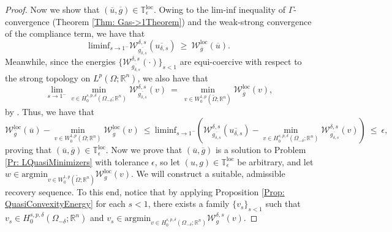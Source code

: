 \documentclass[11pt, reqno]{amsart}   	%
\theoremstyle{plain}
\numberwithin{equation}{section}
\def\de{\delta}
\def\ep{\epsilon}
\def\Ga{\Gamma}
\def\Om{\Omega}
\def\R{\mathbb{R}}
\def\argmin{\text{argmin}}
\def\liminf{\text{liminf}}
\def\loc{\text{loc}}
\newcommand{\JMS}[1]{{\color{orange} {\bf J. Siktar:} [#1] }}
\begin{document}
\begin{proof}
Now we show that $(\overline{u}, \overline{g}) \in \mathbb{T}^{\loc}_{\ep}$.
Owing to the lim-inf inequality of $\Ga$-convergence (Theorem \ref{Thm: Gas->1Theorem}) and the weak-strong convergence of the compliance term, we have that
\begin{equation}\label{Eq: QuasiMinimizersConvergenceOfMinss->1LimInfEq1}
    \liminf_{s \rightarrow 1^-}\mathcal{W}^{\de, s}_{\overline{g_{\de, s}}}(\overline{u_{\de, s}}) \ \geq \ \mathcal{W}^{\loc}_{\overline{g}}(\overline{u}).
\end{equation}
Meanwhile, since the energies $\{\mathcal{W}^{\de, s}_{\overline{g_{\de, s}}}(\cdot)\}_{s < 1}$ are equi-coercive with respect to the strong topology on $L^p(\Om; \R^n)$, we also have that
\begin{equation}\label{Eq: QuasiMinimizersConvergenceOfMinss->1LimInfEq2}
    \lim_{s \rightarrow 1^-}\min_{v \in H^{s, p, \de}_0(\Om_{-\de}; \R^n)}\mathcal{W}^{\de, s}_{\overline{g_{\de, s}}}(v) \ = \ \min_{v \in W^{1, p}_0(\widetilde{\Om}; \R^n)}\mathcal{W}^{\loc}_{\overline{g}}(v),
\end{equation}
by \cite[Corollary 7.20]{dal2012introduction}. Thus, we have that
\begin{equation}\label{Eq: QuasiMinimizersConvergenceOfMinss->1LimInfEq3}
    \mathcal{W}^{\loc}_{\overline{g}}(\overline{u}) - \min_{v \in W^{1, p}_0(\Om; \R^n)}\mathcal{W}^{\loc}_{\overline{g}}(v) \ \leq \ \liminf_{s \rightarrow 1^-}\left(\mathcal{W}^{\de, s}_{\overline{g_{\de, s}}}(\overline{u_{\de, s}}) - \min_{v \in H^{s, p, \de}_0(\Om_{-\de}; \R^n)}\mathcal{W}^{\de, s}_{\overline{g_{\de, s}}}(v)\right) \ \leq \ \ep,
\end{equation}
proving that $(\overline{u}, \overline{g}) \in \mathbb{T}^{\loc}_{\ep}$. 
     Now we prove that $(\overline{u}, \overline{g})$ is a solution to Problem \ref{Pr: LQuasiMinimizers} with tolerance $\ep$, so let $(u, g) \in \mathbb{T}^{\loc}_{\ep}$ be arbitrary, and let $w \in \argmin_{v \in W^{1, p}_0(\widetilde{\Om}; \R^n)}\mathcal{W}^{\loc}_g(v)$. We will construct a suitable, admissible recovery sequence. To this end, notice that by applying Proposition \ref{Prop: QuasiConvexityEnergy} for each $s < 1$, there exists a family $\{v_s\}_{s < 1}$ such that $v_s \in H^{s, p, \de}_0(\Om_{-\de}; \R^n)$ and $v_s \in \argmin_{v \in H^{s, p, \de}_0(\Om_{-\de}; \R^n)}\mathcal{W}^{\de, s}_g(v)$. 
     

\end{proof}
\end{document}

